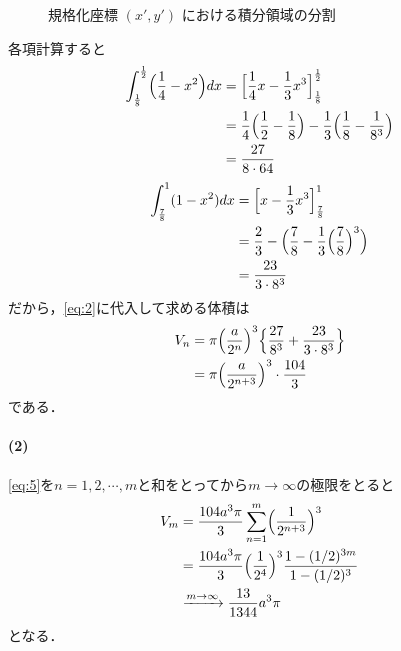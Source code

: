 \documentclass[../../main.tex]{subfiles}
\begin{document}
\begin{figure}[htb]
  \caption{規格化座標 $(x', y')$ における積分領域の分割}
  \label{fig:normalized_cross_section_integral}
\end{figure}

各項計算すると
\begin{align}
  \int_{\frac{1}{8}}^{\frac{1}{2}} \Bigl(\dfrac{1}{4} - x^2\Bigr) dx
  & = \Bigl[ \dfrac{1}{4} x - \dfrac{1}{3} x^3 \Bigr]_{\frac{1}{8}}^{\frac{1}{2}}  \\
  & = \dfrac{1}{4} \Bigl( \dfrac{1}{2} - \dfrac{1}{8} \Bigr) - \dfrac{1}{3} \Bigl( \dfrac{1}{8} - \dfrac{1}{8^3} \Bigr) \\
  &= \dfrac{27}{8 \cdot 64} \label{eq:3}
\end{align}
\begin{align}
  \int_{\frac{7}{8}}^1 (1 - x^2) dx
  &= \Bigl[ x - \dfrac{1}{3} x^3 \Bigr]_{\frac{7}{8}}^1  \\
  &= \dfrac{2}{3} - \Bigl( \dfrac{7}{8} - \dfrac{1}{3} \Bigl( \dfrac{7}{8} \Bigr)^3 \Bigr) \\
  &= \dfrac{23}{3 \cdot 8^3} \label{eq:4}
\end{align}
だから，\cref{eq:2}に代入して求める体積は
\begin{align}
  V_n
  &= \pi \Bigl(\dfrac{a}{2^n}\Bigr)^3 \Bigl\{ \dfrac{27}{8^3} + \dfrac{23}{3 \cdot 8^3} \Bigr\} \\
  &= \pi \Bigl(\dfrac{a}{2^{n+3}}\Bigr)^3 \cdot \dfrac{104}{3} \label{eq:5}
\end{align}
である．

\paragraph{(2)}
\cref{eq:5}を$n=1,2,\cdots,m$と和をとってから$m\to\infty$の極限をとると
\begin{align}
  V_m
  &= \dfrac{104 a^3 \pi}{3} \sum_{n=1}^m \Bigl(\dfrac{1}{2^{n+3}}\Bigr)^3 \\
  &= \dfrac{104 a^3 \pi}{3} \Bigl(\dfrac{1}{2^4}\Bigr)^3 \dfrac{1 - (1/2)^{3m}}{1 - (1/2)^3} \\
  &\xrightarrow{m \to \infty} \dfrac{13}{1344} a^3 \pi
\end{align}
となる．
\end{document}
